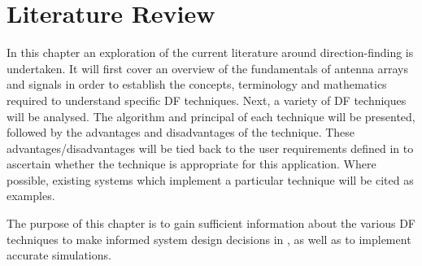 \chapter{Literature Review}
\label{ch:lit-review}
In this chapter an exploration of the current literature around direction-finding is undertaken.
It will first cover an overview of the fundamentals of antenna arrays and signals in order to establish the concepts, terminology and mathematics required to understand specific DF techniques. 
Next, a variety of DF techniques will be analysed. The algorithm and principal of each technique will be presented, followed by the advantages and disadvantages of the technique. 
These advantages/disadvantages will be tied back to the user requirements defined in  to ascertain whether the technique is appropriate for this application. Where possible, existing systems which implement a particular technique will be cited as examples.

The purpose of this chapter is to gain sufficient information about the various DF techniques to make informed system design decisions in , as well as to implement accurate simulations.




